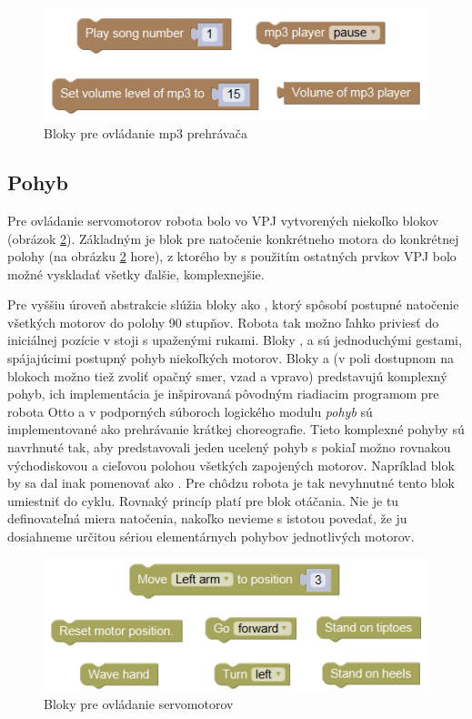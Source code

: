 \begin{figure}
\centerline{\includegraphics[]{images/mp3-blocks}}
\caption[Bloky pre ovládanie mp3 prehrávača]{Bloky pre ovládanie mp3 prehrávača}
\label{obr:mp3-blocks}
\end{figure}

\newpage

\subsection{Pohyb}
Pre ovládanie servomotorov robota bolo vo VPJ vytvorených niekoľko blokov (obrázok \ref{obr:move-blocks}). Základným je blok pre natočenie konkrétneho motora do konkrétnej polohy (na obrázku \ref{obr:move-blocks} hore), z ktorého by s použitím ostatných prvkov VPJ bolo možné vyskladať všetky ďalšie, komplexnejšie.

Pre vyššiu úroveň abstrakcie slúžia bloky ako , ktorý spôsobí postupné natočenie všetkých motorov do polohy 90 stupňov. Robota tak možno ľahko priviesť do iniciálnej pozície v stoji s upaženými rukami. Bloky ,  a  sú jednoduchými gestami, spájajúcimi postupný pohyb niekoľkých motorov. Bloky  a  (v poli dostupnom na blokoch možno tiež zvoliť opačný smer, vzad a vpravo) predstavujú komplexný pohyb, ich implementácia je inšpirovaná pôvodným riadiacim programom pre robota Otto a v podporných súboroch logického modulu \textit{pohyb} sú implementované ako prehrávanie krátkej choreografie. Tieto komplexné pohyby sú navrhnuté tak, aby predstavovali jeden ucelený pohyb s pokiaľ možno rovnakou východiskovou a cieľovou polohou všetkých zapojených motorov. Napríklad blok  by sa dal inak pomenovať ako . Pre chôdzu robota je tak nevyhnutné tento blok umiestniť do cyklu. Rovnaký princíp platí pre blok otáčania. Nie je tu definovateľná miera natočenia, nakoľko nevieme s istotou povedať, že ju dosiahneme určitou sériou elementárnych pohybov jednotlivých motorov.

\begin{figure}[bh!]
\centerline{\includegraphics[]{images/move-blocks}}
\caption[Bloky pre ovládanie servomotorov]{Bloky pre ovládanie servomotorov}
\label{obr:move-blocks}
\end{figure}


